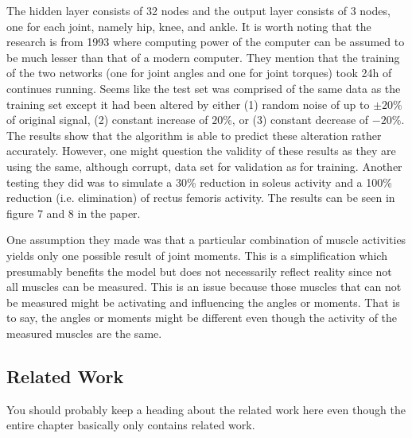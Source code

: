 The hidden layer consists of 32 nodes and the output layer consists of 3 nodes, one for each joint, namely hip, knee, and ankle.
It is worth noting that the research is from 1993 where computing power of the computer can be assumed to be much lesser than that of a modern computer.
They mention that the training of the two networks (one for joint angles and one for joint torques) took 24h of continues running.
Seems like the test set was comprised of the same data as the training set except it had been altered by either (1) random noise of up to $\pm 20\%$ of original signal, (2) constant increase of $20\%$, or (3) constant decrease of $-20\%$.
The results show that the algorithm is able to predict these alteration rather accurately. 
However, one might question the validity of these results as they are using the same, although corrupt, data set for validation as for training.
Another testing they did was to simulate a 30\% reduction in soleus activity and a 100\% reduction (i.e. elimination) of rectus femoris activity. 
The results can be seen in figure 7 and 8 in the paper.

One assumption they made was that a particular combination of muscle activities yields only one possible result of joint moments. This is a simplification which presumably benefits the model but does not necessarily reflect reality since not all muscles can be measured. This is an issue because those muscles that can not be measured might be activating and influencing the angles or moments. That is to say, the angles or moments might be different even though the activity of the measured muscles are the same.

\subsection{Related Work}
You should probably keep a heading about the related work here even though the entire chapter basically only contains related work.
